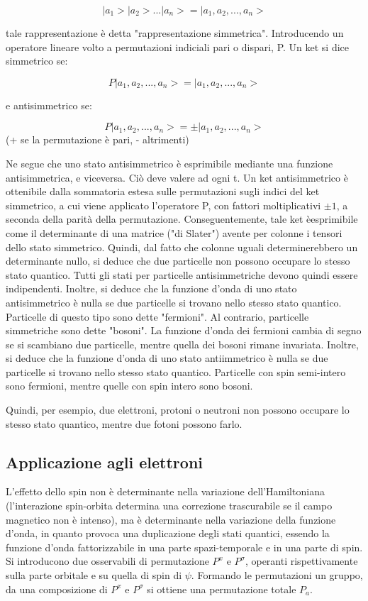 \documentclass{article}
\begin{document}
\begin{equation}
    |a_1>|a_2>...|a_n>=|a_1,a_2,...,a_n>
\end{equation}

tale rappresentazione è detta "rappresentazione simmetrica".
Introducendo un operatore lineare volto a permutazioni indiciali pari o dispari, P.
Un ket si dice simmetrico se:

\begin{equation}
    P|a_1,a_2,...,a_n>=|a_1,a_2,...,a_n>
\end{equation}

e antisimmetrico se:

\begin{equation}
    P|a_1,a_2,...,a_n>=\pm|a_1,a_2,...,a_n>
\end{equation}
(+ se la permutazione è pari, - altrimenti)

Ne segue che uno stato antisimmetrico è esprimibile mediante una funzione antisimmetrica, e viceversa.
Ciò deve valere ad ogni t.
Un ket antisimmetrico è ottenibile dalla sommatoria estesa sulle permutazioni sugli indici del ket simmetrico, a cui viene applicato l'operatore P, con fattori moltiplicativi $\pm 1$, a
seconda della parità della permutazione.
Conseguentemente, tale ket èesprimibile come il determinante di una matrice ("di Slater") avente per colonne i tensori dello stato simmetrico.
Quindi, dal fatto che colonne uguali determinerebbero un determinante nullo, si deduce che due particelle non possono occupare lo stesso stato quantico.
Tutti gli stati per particelle antisimmetriche devono quindi essere indipendenti.
Inoltre, si deduce che la funzione d'onda di uno stato antisimmetrico è nulla se due particelle si trovano nello stesso stato quantico.
Particelle di questo tipo sono dette "fermioni".
Al contrario, particelle simmetriche sono dette "bosoni".
La funzione d'onda dei fermioni cambia di segno se si scambiano due particelle, mentre quella dei bosoni rimane invariata.
Inoltre, si deduce che la funzione d'onda di uno stato antiimmetrico è nulla se due particelle si trovano nello stesso stato quantico.
Particelle con spin semi-intero sono fermioni, mentre quelle con spin intero sono bosoni.

Quindi, per esempio, due elettroni, protoni o neutroni non possono occupare lo stesso stato quantico, mentre due fotoni possono farlo.

\subsection*{Applicazione agli elettroni}
L'effetto dello spin non è determinante nella variazione dell'Hamiltoniana (l'interazione spin-orbita determina una correzione trascurabile se il campo
magnetico non è intenso), ma è determinante nella variazione della funzione d'onda, in quanto provoca una duplicazione degli stati quantici,
essendo la funzione d'onda fattorizzabile in una parte spazi-temporale e in una parte di spin.
Si introducono due osservabili di permutazione $P^x$ e $P^\sigma$, operanti rispettivamente sulla parte orbitale e su quella di spin di $\psi$.
Formando le permutazioni un gruppo, da una composizione di $P^x$ e $P^\sigma$ si ottiene una permutazione totale $P_a$.
\end{document}
